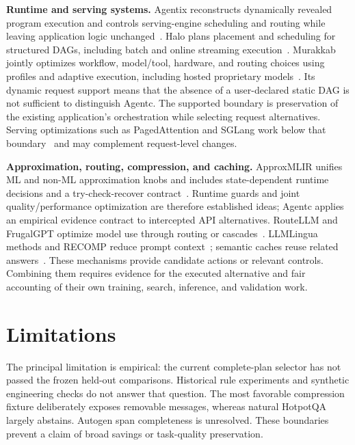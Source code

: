 \textbf{Runtime and serving systems.}
Agentix reconstructs dynamically revealed program execution and controls serving-engine
scheduling and routing while leaving application logic
unchanged~\cite{luo2026agentix}. Halo plans placement and scheduling for structured
DAGs, including batch and online streaming execution~\cite{shen2026halo}. Murakkab
jointly optimizes workflow, model/tool, hardware, and routing choices using profiles
and adaptive execution, including hosted proprietary
models~\cite{chaudhry2025murakkab}. Its dynamic request support means that the
absence of a user-declared static DAG is not sufficient to distinguish Agentc.
The supported boundary is preservation of the existing application's orchestration
while selecting request alternatives. Serving optimizations such as PagedAttention
and SGLang work below that boundary~\cite{kwon2023vllm,zheng2024sglang} and may
complement request-level changes.

\textbf{Approximation, routing, compression, and caching.}
ApproxMLIR unifies ML and non-ML approximation knobs and includes state-dependent
runtime decisions and a try-check-recover contract~\cite{ren2026approxmlir}. Runtime
guards and joint quality/performance optimization are therefore established ideas;
Agentc applies an empirical evidence contract to intercepted API alternatives.
RouteLLM and FrugalGPT optimize model use through routing or
cascades~\cite{ong2025routellm,chen2024frugalgpt}. LLMLingua methods and RECOMP reduce
prompt context~\cite{jiang2023llmlingua,pan2024llmlingua2,xu2024recomp}; semantic caches
reuse related answers~\cite{bang2023gptcache,gill2025meancache,schroeder2026vcache}.
These mechanisms provide candidate actions or relevant controls. Combining them
requires evidence for the executed alternative and fair accounting of their own
training, search, inference, and validation work.

\section{Limitations}
\label{sec:limitations}

The principal limitation is empirical: the current complete-plan selector has not
passed the frozen held-out comparisons. Historical rule experiments and synthetic
engineering checks do not answer that question. The most favorable compression
fixture deliberately exposes removable messages, whereas natural HotpotQA largely
abstains. Autogen span completeness is unresolved. These boundaries prevent a
claim of broad savings or task-quality preservation.

